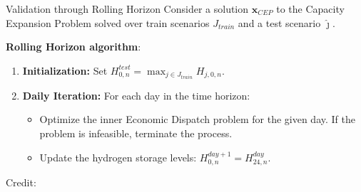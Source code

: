 \documentclass[pdf]{beamer}
\begin{document}
  \begin{frame}{Validation through Rolling Horizon}
    Consider a solution $\mathbf{x}_{CEP}$ to the Capacity Expansion Problem solved over train scenarios $J_{train}$ and a test scenario $\hat{\jmath}$.
    \vspace{1em}

    \textbf{Rolling Horizon algorithm}:
    \begin{enumerate}
      \item \textbf{Initialization:} Set \( H_{0,n}^{test} = \max_{j \in J_{train}} H_{j,0,n} \).
      
      \item \textbf{Daily Iteration:} For each day in the time horizon:
      \begin{itemize}
          \item Optimize the inner Economic Dispatch problem for the given day. If the problem is infeasible, terminate the process.
          \item Update the hydrogen storage levels: $H_{0,n}^{day+1} = H_{24,n}^{day}$.
      \end{itemize}
    \end{enumerate}
    \centering
      \hbox{\scriptsize Credit:}
  \end{frame}
\end{document}

